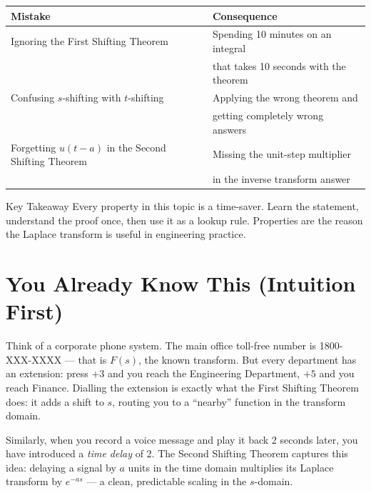 \documentclass[12pt,a4paper]{article}
\begin{document}
\vspace{0.5em}
\begin{center}
\begin{tabular}{@{}ll@{}}
\toprule
\textbf{Mistake} & \textbf{Consequence} \\
\midrule
Ignoring the First Shifting Theorem & Spending 10 minutes on an integral \\
                                    & that takes 10 seconds with the theorem \\
\midrule
Confusing $s$-shifting with $t$-shifting & Applying the wrong theorem and \\
                                          & getting completely wrong answers \\
\midrule
Forgetting $u(t-a)$ in the Second Shifting Theorem & Missing the unit-step multiplier \\
                                                    & in the inverse transform answer \\
\bottomrule
\end{tabular}
\end{center}
\vspace{0.5em}

\begin{learnbox}{Key Takeaway}
Every property in this topic is a time-saver. Learn the statement, understand the proof once,
then use it as a lookup rule. Properties are the reason the Laplace transform is useful in
engineering practice.
\end{learnbox}

\section{You Already Know This (Intuition First)}
Think of a corporate phone system. The main office toll-free number is 1800-XXX-XXXX --- that
is $F(s)$, the known transform. But every department has an extension: press $+3$ and you
reach the Engineering Department, $+5$ and you reach Finance. Dialling the extension is exactly
what the First Shifting Theorem does: it adds a shift to $s$, routing you to a ``nearby''
function in the transform domain.

Similarly, when you record a voice message and play it back 2 seconds later, you have introduced
a \emph{time delay} of 2. The Second Shifting Theorem captures this idea: delaying a signal
by $a$ units in the time domain multiplies its Laplace transform by $e^{-as}$ --- a clean,
predictable scaling in the $s$-domain.
\end{document}

